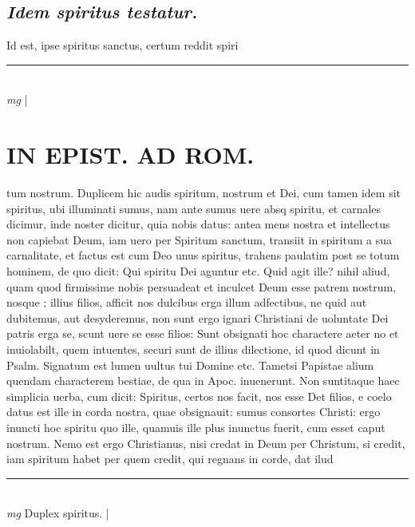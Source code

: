 \documentclass{article}
\begin{document}
\begin{pages}
\subsection*{\textit{Idem spiritus testatur. }}\pstart Id est, ipse spiritus sanctus, certum reddit spiri\pend
\vspace{0.5cm}\noindent
\vspace{0.2cm}\rule{1cm}{0.2pt}\\ 
\hspace{0.2cm}\textit{mg}
\footnotesize 
\normalsize| 
\section*{ IN EPIST. AD ROM.  }
\marginpar{[ p.]}\pstart tum nostrum. Duplicem hic audis spiritum, nostrum et Dei, cum tamen idem sit spiritus, ubi illuminati sumus, nam ante sumus uere absq spiritu, et carnales dicimur, inde noster dicitur, quia nobis datus: antea mens nostra et intellectus non capiebat Deum, iam uero per Spiritum sanctum, transiit in spiritum a sua carnalitate, et factus est cum Deo unus spiritus, trahens paulatim post se totum hominem, de quo dicit: Qui spiritu Dei aguntur etc. Quid agit ille? nihil aliud, quam quod firmissime nobis persuadeat et inculcet Deum esse patrem nostrum, nosque ; illius filios, afficit nos dulcibus erga illum adfectibus, ne quid aut dubitemus, aut desyderemus, non sunt ergo ignari Christiani de uoluntate Dei patris erga se, scunt uere se esse filios: Sunt obsignati hoc charactere aeter no et inuiolabilt, quem intuentes, securi sunt de illius dilectione, id quod dicunt in Psalm. Signatum est lumen uultus tui Domine etc. Tametsi Papistae alium quendam characterem bestiae, de qua in Apoc. inuenerunt. Non suntitaque haec simplicia uerba, cum dicit: Spiritus, certos nos facit, nos esse Det filios, e coelo datus est ille in corda nostra, quae obsignauit: sumus consortes Christi: ergo inuncti hoc spiritu quo ille, quamuis ille plus inunctus fuerit, cum esset caput nostrum. Nemo est ergo Christianus, nisi credat in Deum per Christum, si credit, iam spiritum habet per quem credit, qui regnans in corde, dat ilud  \pend
\vspace{0.5cm}\noindent
\vspace{0.2cm}\rule{1cm}{0.2pt}\\ 
\hspace{0.2cm}\textit{mg}
\footnotesize Duplex spiritus.  
\normalsize| 

\end{pages}
\end{document}
